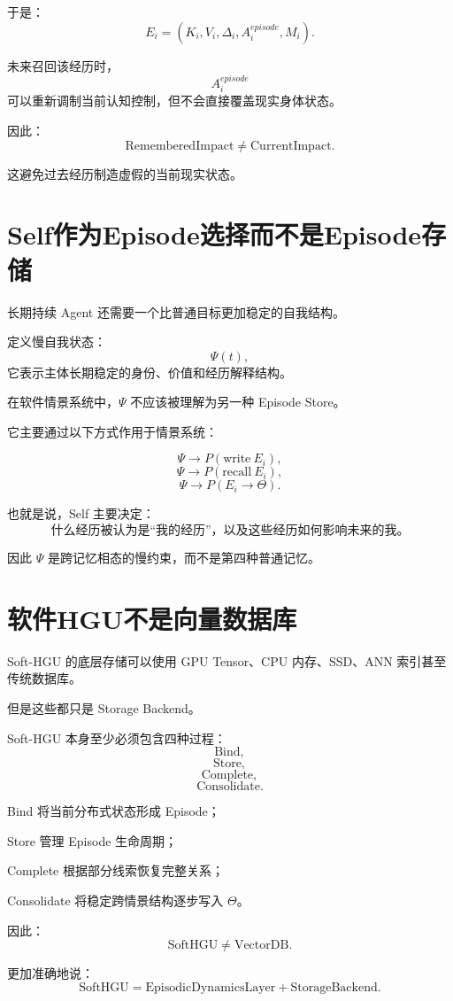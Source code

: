 于是：
\[
E_i
=
(
K_i,
V_i,
\Delta_i,
A_i^{episode},
M_i
).
\]

未来召回该经历时，
\[
A_i^{episode}
\]
可以重新调制当前认知控制，但不会直接覆盖现实身体状态。

因此：
\[
\boxed{
\mathrm{RememberedImpact}
\neq
\mathrm{CurrentImpact}.
}
\]

这避免过去经历制造虚假的当前现实状态。

\section{Self作为Episode选择而不是Episode存储}

长期持续 Agent 还需要一个比普通目标更加稳定的自我结构。

定义慢自我状态：
\[
\Psi(t),
\]
它表示主体长期稳定的身份、价值和经历解释结构。

在软件情景系统中，$\Psi$ 不应该被理解为另一种 Episode Store。

它主要通过以下方式作用于情景系统：

\[
\Psi
\rightarrow
P(\mathrm{write}\ E_i),
\]
\[
\Psi
\rightarrow
P(\mathrm{recall}\ E_i),
\]
\[
\Psi
\rightarrow
P(E_i\rightarrow\Theta).
\]

也就是说，Self 主要决定：
\[
\boxed{
\text{什么经历被认为是``我的经历''，以及这些经历如何影响未来的我。}
}
\]

因此 $\Psi$ 是跨记忆相态的慢约束，而不是第四种普通记忆。

\section{软件HGU不是向量数据库}

Soft-HGU 的底层存储可以使用 GPU Tensor、CPU 内存、SSD、ANN 索引甚至传统数据库。

但是这些都只是 Storage Backend。

Soft-HGU 本身至少必须包含四种过程：
\[
\boxed{
\mathrm{Bind},
}
\]
\[
\boxed{
\mathrm{Store},
}
\]
\[
\boxed{
\mathrm{Complete},
}
\]
\[
\boxed{
\mathrm{Consolidate}.
}
\]

Bind 将当前分布式状态形成 Episode；

Store 管理 Episode 生命周期；

Complete 根据部分线索恢复完整关系；

Consolidate 将稳定跨情景结构逐步写入 $\Theta$。

因此：
\[
\boxed{
\mathrm{SoftHGU}
\neq
\mathrm{VectorDB}.
}
\]

更加准确地说：
\[
\boxed{
\mathrm{SoftHGU}
=
\mathrm{EpisodicDynamicsLayer}
+
\mathrm{StorageBackend}.
}
\]

